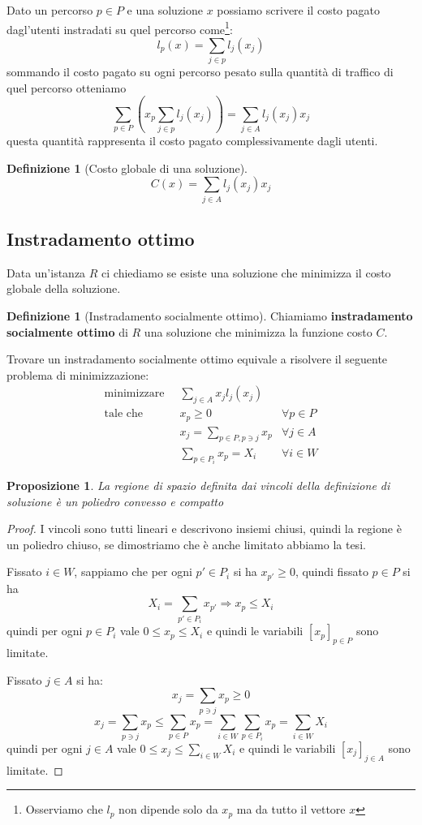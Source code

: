 \documentclass[a4paper]{article}
\theoremstyle{plain}
\newtheorem{mypro}[myteo]{Proposizione}
\theoremstyle{definition}
\newtheorem{mydef}[myteo]{Definizione}
\theoremstyle{remark}
\newcommand{\pa}[1]{\left(#1\right)}
\newcommand{\bra}[1]{\left[#1\right]}
\begin{document}
Dato un percorso $p\in P$ e una soluzione $x$ possiamo scrivere il
costo pagato dagl'utenti instradati su quel percorso
come\footnote{Osserviamo che $l_p$ non dipende solo da $x_p$ ma da
  tutto il vettore $x$}:
\[ l_p\pa{x} = \sum _{j\in p} l_j\pa{x_j} \]
sommando il costo pagato su ogni percorso pesato sulla quantit\`a di
traffico di quel percorso otteniamo
\[ \sum _{p\in P} \pa{ x_p \sum _{j\in p} l_j\pa{x_j}}  = \sum _{j\in
    A} l_j\pa{x_j}x_j \]
questa quantit\`a rappresenta il costo pagato complessivamente dagli utenti.

\begin{mydef}[Costo globale di una soluzione]
\label{def:costo-globale}
  \[ C\pa{x} = \sum _{j\in A} l_j\pa{x_j}x_j \]  
\end{mydef}

\subsection{Instradamento ottimo}
\label{sec:instramento-ottimo}

Data un'istanza $R$ ci chiediamo se esiste una soluzione che minimizza
il costo globale della soluzione.

\begin{mydef}[Instradamento socialmente ottimo]
\label{def:soluzione-so}
  Chiamiamo \textbf{instradamento socialmente ottimo} di $R$ una
  soluzione che minimizza la funzione costo $C$. 
\end{mydef}

Trovare un instradamento socialmente ottimo equivale a risolvere il
seguente problema di minimizzazione:
\begin{align*}
      \text{minimizzare}\;\; & \sum _{j\in A} x_j l_j(x_j) \\
      \text{tale che}\;\; &   x_p \ge 0 & \forall p\in P \\
      & x_j = \sum_{p\in P,p\ni j} x_p & \forall j\in A \\
      &\sum_{p\in P_i} x_p = X_i & \forall i\in W
\end{align*}

\begin{mypro}
  La regione di spazio definita dai vincoli della definizione di
  soluzione \`e un poliedro convesso e compatto
\end{mypro}
\begin{proof}
  I vincoli sono tutti lineari e descrivono insiemi chiusi, quindi la
  regione \`e un poliedro chiuso, se dimostriamo che \`e anche
  limitato abbiamo la tesi.

  Fissato $i\in W$, sappiamo che per ogni $p'\in P_i$ si ha $x_{p'} \ge
  0$, quindi fissato $p\in P$ si ha
  \[ X_i = \sum _{p'\in P_i} x_{p'} \Rightarrow x_p \le X_i \]
  quindi per ogni $p\in P_i$ vale $0\le x_p \le X_i$ e quindi le
  variabili $\bra{x_p}_{p\in P}$ sono limitate.

  Fissato $j\in A$ si ha:
  \[ x_j = \sum _{p\ni j} x_p \ge 0 \]
  \[ x_j = \sum _{p\ni j} x_p \le \sum _{p\in P} x_p = \sum _{i\in W}
    \sum _{p\in P_i} x_p = \sum _{i\in W} X_i \]
  quindi per ogni $j\in A$ vale $0\le x_j \le \sum _{i\in W} X_i$ e
  quindi le variabili $\bra{x_j}_{j\in A}$ sono limitate.
\end{proof}
\end{document}
